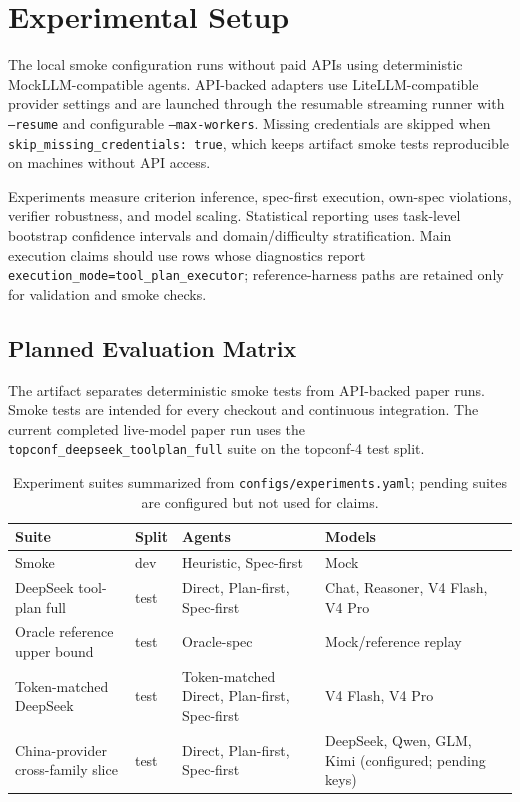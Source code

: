 \section{Experimental Setup}
The local smoke configuration runs without paid APIs using deterministic MockLLM-compatible agents. API-backed adapters use LiteLLM-compatible provider settings and are launched through the resumable streaming runner with \texttt{--resume} and configurable \texttt{--max-workers}. Missing credentials are skipped when \texttt{skip\_missing\_credentials: true}, which keeps artifact smoke tests reproducible on machines without API access.

Experiments measure criterion inference, spec-first execution, own-spec violations, verifier robustness, and model scaling. Statistical reporting uses task-level bootstrap confidence intervals and domain/difficulty stratification. Main execution claims should use rows whose diagnostics report \texttt{execution\_mode=tool\_plan\_executor}; reference-harness paths are retained only for validation and smoke checks.

\subsection{Planned Evaluation Matrix}

The artifact separates deterministic smoke tests from API-backed paper runs. Smoke tests are intended for every checkout and continuous integration. The current completed live-model paper run uses the \texttt{topconf\_deepseek\_toolplan\_full} suite on the topconf-4 test split.

\begin{table}[tbp]
\centering
\small
\begin{tabularx}{\linewidth}{lX X X}
\toprule
Suite & Split & Agents & Models \\
\midrule
Smoke & dev & Heuristic, Spec-first & Mock \\
DeepSeek tool-plan full & test & Direct, Plan-first, Spec-first & Chat, Reasoner, V4 Flash, V4 Pro \\
Oracle reference upper bound & test & Oracle-spec & Mock/reference replay \\
Token-matched DeepSeek & test & Token-matched Direct, Plan-first, Spec-first & V4 Flash, V4 Pro \\
China-provider cross-family slice & test & Direct, Plan-first, Spec-first & DeepSeek, Qwen, GLM, Kimi (configured; pending keys) \\
\bottomrule
\end{tabularx}
\caption{Experiment suites summarized from \texttt{configs/experiments.yaml}; pending suites are configured but not used for claims.}
\end{table}

